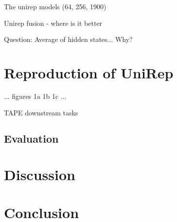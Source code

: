 \documentclass[a4paper,11pt]{article}
\begin{document}
The unirep models (64, 256, 1900) \cite{alley2019unified}

Unirep fusion - where is it better

Question: Average of hidden states... Why?

\clearpage
\section{Reproduction of UniRep}

... figures 1a 1b 1c ...

TAPE downstream tasks

\subsection{Evaluation}

\clearpage
\section{Discussion}

\clearpage
\section{Conclusion}


\clearpage
\printbibliography[title={References}]
\end{document}
